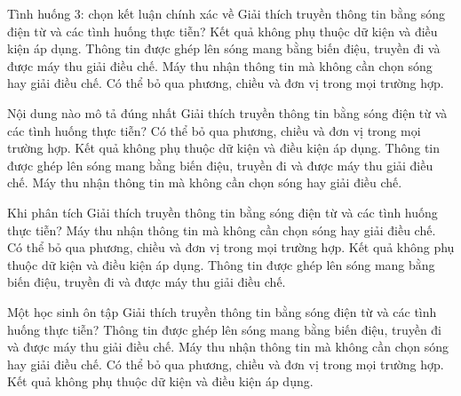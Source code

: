 \begin{ex}
Tình huống 3: chọn kết luận chính xác về Giải thích truyền thông tin bằng sóng điện từ và các tình huống thực tiễn?
\choice
{Kết quả không phụ thuộc dữ kiện và điều kiện áp dụng.}
{\True Thông tin được ghép lên sóng mang bằng biến điệu, truyền đi và được máy thu giải điều chế.}
{Máy thu nhận thông tin mà không cần chọn sóng hay giải điều chế.}
{Có thể bỏ qua phương, chiều và đơn vị trong mọi trường hợp.}
\end{ex}

\begin{ex}
Nội dung nào mô tả đúng nhất Giải thích truyền thông tin bằng sóng điện từ và các tình huống thực tiễn?
\choice
{Có thể bỏ qua phương, chiều và đơn vị trong mọi trường hợp.}
{Kết quả không phụ thuộc dữ kiện và điều kiện áp dụng.}
{\True Thông tin được ghép lên sóng mang bằng biến điệu, truyền đi và được máy thu giải điều chế.}
{Máy thu nhận thông tin mà không cần chọn sóng hay giải điều chế.}
\end{ex}

\begin{ex}
Khi phân tích Giải thích truyền thông tin bằng sóng điện từ và các tình huống thực tiễn?
\choice
{Máy thu nhận thông tin mà không cần chọn sóng hay giải điều chế.}
{Có thể bỏ qua phương, chiều và đơn vị trong mọi trường hợp.}
{Kết quả không phụ thuộc dữ kiện và điều kiện áp dụng.}
{\True Thông tin được ghép lên sóng mang bằng biến điệu, truyền đi và được máy thu giải điều chế.}
\end{ex}

\begin{ex}
Một học sinh ôn tập Giải thích truyền thông tin bằng sóng điện từ và các tình huống thực tiễn?
\choice
{\True Thông tin được ghép lên sóng mang bằng biến điệu, truyền đi và được máy thu giải điều chế.}
{Máy thu nhận thông tin mà không cần chọn sóng hay giải điều chế.}
{Có thể bỏ qua phương, chiều và đơn vị trong mọi trường hợp.}
{Kết quả không phụ thuộc dữ kiện và điều kiện áp dụng.}
\end{ex}

